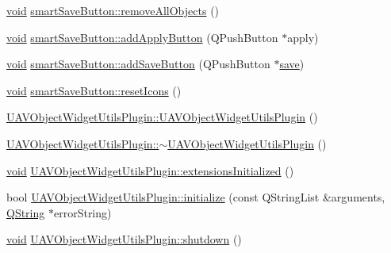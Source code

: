 \begin{DoxyCompactItemize}
\item 
\hyperlink{group___u_a_v_objects_plugin_ga444cf2ff3f0ecbe028adce838d373f5c}{void} \hyperlink{group___u_a_v_object_widget_utils_ga2e09103bceedaf1f2756c7a688da035c}{smart\-Save\-Button\-::remove\-All\-Objects} ()
\item 
\hyperlink{group___u_a_v_objects_plugin_ga444cf2ff3f0ecbe028adce838d373f5c}{void} \hyperlink{group___u_a_v_object_widget_utils_gab4059d84ec9c8e40beed303a7ad8550a}{smart\-Save\-Button\-::add\-Apply\-Button} (Q\-Push\-Button $\ast$apply)
\item 
\hyperlink{group___u_a_v_objects_plugin_ga444cf2ff3f0ecbe028adce838d373f5c}{void} \hyperlink{group___u_a_v_object_widget_utils_ga85e413cf895d8a514e748a8ebf6a67ec}{smart\-Save\-Button\-::add\-Save\-Button} (Q\-Push\-Button $\ast$\hyperlink{uavobjecttemplate_8m_a79178933c5b76091ca04178d14a5ba98}{save})
\item 
\hyperlink{group___u_a_v_objects_plugin_ga444cf2ff3f0ecbe028adce838d373f5c}{void} \hyperlink{group___u_a_v_object_widget_utils_ga851955edd99204e2b209b7fa604129fe}{smart\-Save\-Button\-::reset\-Icons} ()
\item 
\hyperlink{group___u_a_v_object_widget_utils_ga71c193fdd4f73fd349dbb72db72a1d05}{U\-A\-V\-Object\-Widget\-Utils\-Plugin\-::\-U\-A\-V\-Object\-Widget\-Utils\-Plugin} ()
\item 
\hyperlink{group___u_a_v_object_widget_utils_ga2c7561526e629a5fcaa9bf2def2a4b8c}{U\-A\-V\-Object\-Widget\-Utils\-Plugin\-::$\sim$\-U\-A\-V\-Object\-Widget\-Utils\-Plugin} ()
\item 
\hyperlink{group___u_a_v_objects_plugin_ga444cf2ff3f0ecbe028adce838d373f5c}{void} \hyperlink{group___u_a_v_object_widget_utils_ga8538f7844616deeef2455da33bc8a9fe}{U\-A\-V\-Object\-Widget\-Utils\-Plugin\-::extensions\-Initialized} ()
\item 
bool \hyperlink{group___u_a_v_object_widget_utils_ga7a913580e5284f9291cab68f3bfed4a3}{U\-A\-V\-Object\-Widget\-Utils\-Plugin\-::initialize} (const Q\-String\-List \&arguments, \hyperlink{group___u_a_v_objects_plugin_gab9d252f49c333c94a72f97ce3105a32d}{Q\-String} $\ast$error\-String)
\item 
\hyperlink{group___u_a_v_objects_plugin_ga444cf2ff3f0ecbe028adce838d373f5c}{void} \hyperlink{group___u_a_v_object_widget_utils_ga672bbb620f7be71610e6adc36d5ca0b9}{U\-A\-V\-Object\-Widget\-Utils\-Plugin\-::shutdown} ()
\end{DoxyCompactItemize}
